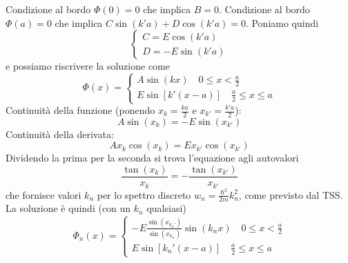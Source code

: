 \documentclass[a4paper]{article}
\begin{document}
        Condizione al bordo $\Phi(0)=0$ che implica $B=0$.
        Condizione al bordo $\Phi(a)=0$ che implica $C\sin(k'a)+D\cos(k'a)=0$.
        Poniamo quindi
        \begin{equation*}
            \begin{cases}
                C=E\cos(k'a)\\
                D=-E\sin(k'a)
            \end{cases}
        \end{equation*}
        e possiamo riscrivere la soluzione come
        \begin{equation*}
            \Phi(x)=
            \begin{cases}
                A\sin(kx)\quad 0\leq x <\frac{a}{2}\\
                E\sin[k'(x-a)]\quad \frac{a}{2}\leq x \leq a
            \end{cases}
        \end{equation*}
        Continuità della funzione (ponendo $x_k=\frac{ka}{2}$ e $x_{k'}=\frac{k'a}{2}$):
        \begin{equation*}
            A\sin(x_k)=-E\sin(x_{k'})
        \end{equation*}
        Continuità della derivata:
        \begin{equation*}
            Ax_k\cos(x_k)=Ex_{k'}\cos(x_{k'})
        \end{equation*}
        Dividendo la prima per la seconda si trova l'equazione agli autovalori
        \begin{equation*}
            \frac{\tan(x_k)}{x_k}=-\frac{\tan(x_{k'})}{x_{k'}}
        \end{equation*}
        che fornisce valori $k_n$ per lo spettro discreto $w_n=\frac{\hbar^2}{2m}k_n^2$, come previsto dal TSS.
        La soluzione è quindi (con un $k_n$ qualsiasi)
        \begin{equation*}
            \Phi_n(x)=
            \begin{cases}
                -E\frac{\sin(x_{k_n'})}{\sin(x_{k_n})}\sin(k_nx)\quad 0\leq x <\frac{a}{2}\\
                E\sin[k_n'(x-a)]\quad \frac{a}{2}\leq x \leq a
            \end{cases}
        \end{equation*}
        \begin{figure}[H]
            \centering
        \end{figure}
\end{document}
